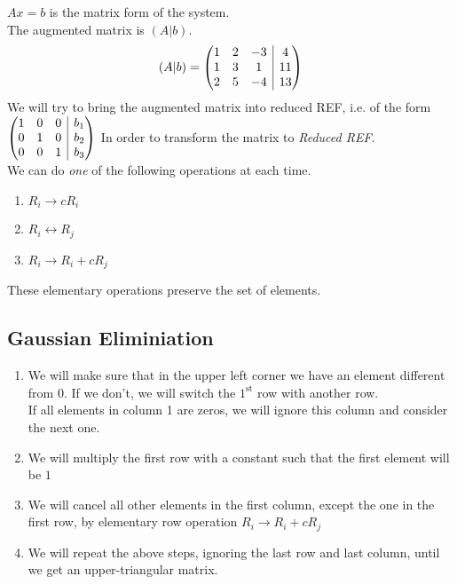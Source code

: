 \documentclass[fleqn]{article}
\makeatletter
\newenvironment{amatrix}[1]{%
	\left(\begin{array}{@{}*{#1}{c}|c@{}}
}{%
	\end{array}\right)
}
\makeatother
\begin{document}
$Ax = b$ is the matrix form of the system.\\
The augmented matrix is $(A|b)$.
\begin{equation*}
	(A|b) = 
	\begin{amatrix}{3}
	1 & 2 & -3 & 4\\
	1 & 3 & 1 & 11\\
	2 & 5 & -4 & 13\\
	\end{amatrix}
\end{equation*}
We will try to bring the augmented matrix into reduced REF, i.e. of the form 
$\begin{amatrix}{3}
	1 & 0 & 0 & b_1\\
	0 & 1 & 0 & b_2\\
	0 & 0 & 1 & b_3\\
\end{amatrix}$
In order to transform the matrix to \emph{Reduced REF}. \\
We can do \emph{one} of the following operations at each time.
\begin{enumerate}
	\item $R_i \rightarrow c R_i$ \label{row }
	\item $R_i \leftrightarrow R_j$
	\item $R_i \rightarrow R_i + c R_j$
\end{enumerate}
These elementary operations preserve the set of elements.

\subsection{Gaussian Eliminiation}

\begin{enumerate}
	\item We will make sure that in the upper left corner we have an element different from $0$. If we don't, we will switch the $1^{\text{st}}$ row with another row. \\
	If all elements in column 1 are zeros, we will ignore this column and consider the next one.
	\item We will multiply the first row with a constant such that the first element will be $1$
	\item We will cancel all other elements in the first column, except the one in the first row, by elementary row operation $R_i \rightarrow R_i + c R_j$
	\item We will repeat the above steps, ignoring the last row and last column, until we get an upper-triangular matrix.
\end{enumerate}
\end{document}
